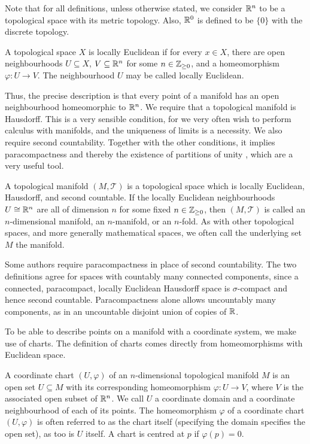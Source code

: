 \documentclass[a4paper,12pt]{article}
\begin{document}
Note that for all definitions, unless otherwise stated, we consider $\mathbb{R}^n$ to be a topological space with its metric topology.
Also, $\mathbb{R}^0$ is defined to be $\{0\}$ with the discrete topology.
\begin{definition}\label{def:locally_euclidean_space}
    A topological space $X$ is locally Euclidean if for every $x \in X$, there are open neighbourhoods $U \subseteq X$, $V \subseteq \mathbb{R}^n$ for some $n \in \mathbb{Z}_{\geq 0}$, and a homeomorphism $\varphi \colon U \to V$.
    The neighbourhood $U$ may be called locally Euclidean.
\end{definition}
Thus, the precise description is that every point of a manifold has an open neighbourhood homeomorphic to $\mathbb{R}^n$.
We require that a topological manifold is Hausdorff.
This is a very sensible condition, for we very often wish to perform calculus with manifolds, and the uniqueness of limits is a necessity.
We also require second countability.
Together with the other conditions, it implies paracompactness \cite[Thm.~1.15]{Lee2012} and thereby the existence of partitions of unity \cite[Thm.~2.23]{Lee2012}, which are a very useful tool.
\begin{definition}\label{def:topological_manifold}
    A topological manifold $(M, \mathcal{T})$ is a topological space which is locally Euclidean, Hausdorff, and second countable.
    If the locally Euclidean neighbourhoods $U \cong \mathbb{R}^n$ are all of dimension $n$ for some fixed $n \in \mathbb{Z}_{\geq 0}$, then $(M, \mathcal{T})$ is called an $n$-dimensional manifold, an $n$-manifold, or an $n$-fold.
    As with other topological spaces, and more generally mathematical spaces, we often call the underlying set $M$ the manifold.
\end{definition}
\begin{remark}
    Some authors require paracompactness in place of second countability.
    The two definitions agree for spaces with countably many connected components, since a connected, paracompact, locally Euclidean Hausdorff space is $\sigma$-compact and hence second countable.
    Paracompactness alone allows uncountably many components, as in an uncountable disjoint union of copies of $\mathbb{R}$.
\end{remark}
    To be able to describe points on a manifold with a coordinate system, we make use of charts.
The definition of charts comes directly from homeomorphisms with Euclidean space.
\begin{definition}\label{def:coordinate_chart}
    A coordinate chart $(U, \varphi)$ of an $n$-dimensional topological manifold $M$ is an open set $U \subseteq M$ with its corresponding homeomorphism $\varphi \colon U \to V$, where $V$ is the associated open subset of $\mathbb{R}^n$.
    We call $U$ a coordinate domain and a coordinate neighbourhood of each of its points.
    The homeomorphism $\varphi$ of a coordinate chart $(U, \varphi)$ is often referred to as the chart itself (specifying the domain specifies the open set), as too is $U$ itself.
    A chart is centred at $p$ if $\varphi(p) = 0$.
\end{definition}
\end{document}
